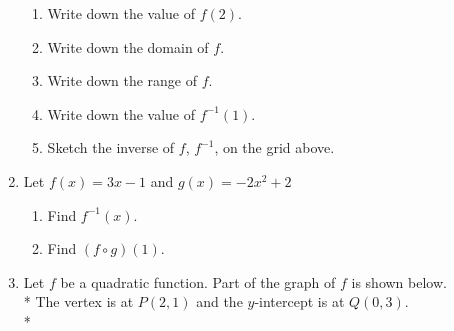 \documentclass[12pt, oneside]{article}
\begin{document}
\begin{enumerate}
\begin{figure}[!htbp]
\begin{center}
\begin{tikzpicture}

\end{tikzpicture}
\end{center}
\end{figure}

\begin{enumerate}
    \item Write down the value of $f(2)$.
    \item Write down the domain of $f$.
    \item Write down the range of $f$.
    \item Write down the value of $f^{-1}(1)$.
    \item Sketch the inverse of $f$, $f^{-1}$, on the grid above.
\end{enumerate}

\item Let $f(x)=3x-1$ and $g(x)=-2x^2+2$
\begin{enumerate}
    \item Find $f^{-1}(x)$.
    \item Find $(f \circ g)(1)$.
\end{enumerate}

  \item Let $f$ be a quadratic function. Part of the graph of $f$ is shown below.\\*
  The vertex is at $P(2,1)$ and the $y$-intercept is at $Q(0, 3)$.\\*

    \begin{figure}[!htbp]
    \begin{center}
\end{center}
\end{figure}
\end{enumerate}
\end{document}
